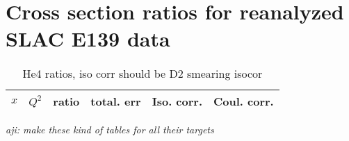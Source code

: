 \section{Cross section ratios for reanalyzed  SLAC E139 data}\label{apndxb.sec}
\begin{table}[htbp]
  \begin{center}
    \begin{tabular}{|c|c|c|c|c|c|}
      \hline
      $x$   & $Q^{2}$ & ratio  & total. err & Iso. corr. & Coul. corr.\\
      \hline     
 
      \hline
    \end{tabular}
  \end{center}
  \caption[]{He4 ratios, iso corr should be D2 smearing isocor}

\label{ratiohe4_table}
\end{table}
 
\textit{aji: make these kind of tables for all their targets}
